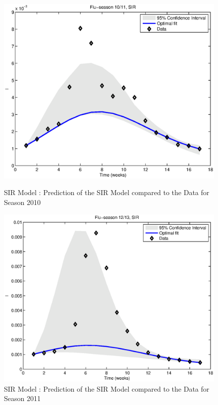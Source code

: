 \documentclass[11pt, a4paper]{article}
\begin{document}
\begin{figure}[h]
\FloatBarrier
\centering
    \includegraphics[height = 0.25\textheight]{figures/SIR_prediction_season1.eps}
    \caption{SIR Model : Prediction of the SIR Model compared to the Data for Season 2010}
    \label{fig:sir_pred1}
    \includegraphics[height = 0.25\textheight]{figures/SIR_prediction_season2.eps}
    \caption{SIR Model : Prediction of the SIR Model compared to the Data for Season 2011}
    \label{fig:sir_pred2}

\end{figure}
\end{document}
